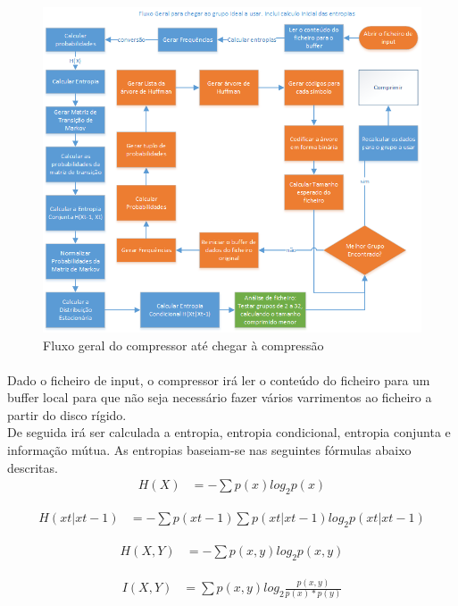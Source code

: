\documentclass[paper=a4, fontsize=11pt]{scrartcl}
\numberwithin{equation}{section}		%
\numberwithin{figure}{section}			%
\numberwithin{table}{section}				%
\begin{document}
\begin{figure}[h!]
\centering
\includegraphics[scale=0.8]{fluxogeral.png} %
\caption{\label{fig:fluxogeral}Fluxo geral do compressor até chegar à compressão}
\end{figure}
\FloatBarrier
\paragraph{}
Dado o ficheiro de input, o compressor irá ler o conteúdo do ficheiro para um buffer local para que não seja necessário fazer vários varrimentos ao ficheiro a partir do disco rígido.
\\
De seguida irá ser calculada a entropia, entropia condicional, entropia conjunta e informação mútua. As entropias baseiam-se nas seguintes fórmulas abaixo descritas.
	\begin{align}
  		H(X) &= -\sum p(x) log_{2} p(x)
  	\end{align}
    
    \begin{align}
  	H(xt|xt-1) &= -\sum p(xt-1)\sum p(xt|xt-1) log_{2} p(xt|xt-1)
	\end{align}
    
    \begin{align}
  	H(X,Y) &= -\sum p(x,y) log_{2} p(x,y)
	\end{align}
    
     \begin{align}
  	I(X,Y) &= \sum p(x,y) log_{2} \frac{p(x,y)} {p(x)*p(y)}
	\end{align}
\end{document}
